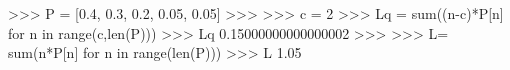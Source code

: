 
>>> P = [0.4, 0.3, 0.2, 0.05, 0.05]
>>>
>>> c = 2
>>> Lq = sum((n-c)*P[n] for n in range(c,len(P)))
>>> Lq
0.15000000000000002
>>>
>>> L= sum(n*P[n] for n in range(len(P)))
>>> L
1.05

